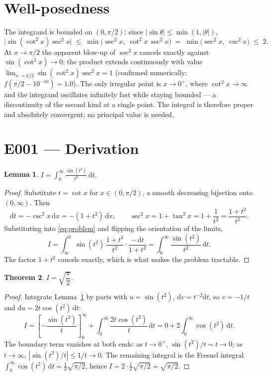 \documentclass[11pt]{article}
\newtheorem{theorem}{Theorem}
\newtheorem{lemma}[theorem]{Lemma}
\begin{document}
\section{Well-posedness}

The integrand is bounded on $(0,\pi/2)$: since $|\sin\theta|\le\min(1,|\theta|)$,
\[
  \big|\sin(\cot^{2}x)\sec^{2}x\big|
  \;\le\; \min\!\big(\sec^{2}x,\;\cot^{2}x\,\sec^{2}x\big)
  \;=\; \min\!\big(\sec^{2}x,\;\csc^{2}x\big) \;\le\; 2 .
\]
At $x\to\pi/2$ the apparent blow-up of $\sec^{2}x$ cancels exactly against
$\sin(\cot^{2}x)\to0$: the product extends continuously with value
$\lim_{x\to\pi/2}\sin(\cot^{2}x)\sec^{2}x = 1$ (confirmed numerically:
$f(\pi/2-10^{-10})=1.0$). The only irregular point is $x\to0^{+}$, where
$\cot^{2}x\to\infty$ and the integrand oscillates infinitely fast while staying
bounded --- a discontinuity of the second kind at a single point. The integral is
therefore proper and absolutely convergent; no principal value is needed.

\section{E001 --- Derivation}

\begin{lemma}\label{lem:sub}
  $I = \displaystyle\int_{0}^{\infty} \frac{\sin(t^{2})}{t^{2}}\,\mathrm{d}t$.
\end{lemma}

\begin{proof}
  Substitute $t=\cot x$ for $x\in(0,\pi/2)$, a smooth decreasing bijection onto
  $(0,\infty)$. Then
  \[
    \mathrm{d}t = -\csc^{2}x\,\mathrm{d}x = -(1+t^{2})\,\mathrm{d}x,
    \qquad
    \sec^{2}x = 1+\tan^{2}x = 1+\frac{1}{t^{2}} = \frac{1+t^{2}}{t^{2}} .
  \]
  Substituting into \eqref{eq:problem} and flipping the orientation of the
  limits,
  \[
    I=\int_{\infty}^{0}\sin(t^{2})\,\frac{1+t^{2}}{t^{2}}
        \cdot\frac{-\,\mathrm{d}t}{1+t^{2}}
     =\int_{0}^{\infty}\frac{\sin(t^{2})}{t^{2}}\,\mathrm{d}t .
  \]
  The factor $1+t^{2}$ cancels exactly, which is what makes the problem tractable.
\end{proof}

\begin{theorem}\label{thm:main}
  $I=\sqrt{\dfrac{\pi}{2}}$.
\end{theorem}

\begin{proof}
  Integrate Lemma~\ref{lem:sub} by parts with $u=\sin(t^{2})$, $\mathrm{d}v=t^{-2}\mathrm{d}t$,
  so $v=-1/t$ and $\mathrm{d}u = 2t\cos(t^{2})\,\mathrm{d}t$:
  \[
    I = \left[-\frac{\sin(t^{2})}{t}\right]_{0}^{\infty}
        + \int_{0}^{\infty}\frac{2t\cos(t^{2})}{t}\,\mathrm{d}t
      = 0 + 2\int_{0}^{\infty}\cos(t^{2})\,\mathrm{d}t .
  \]
  The boundary term vanishes at both ends: as $t\to0^{+}$,
  $\sin(t^{2})/t \sim t \to 0$; as $t\to\infty$, $|\sin(t^{2})/t|\le 1/t \to 0$.
  The remaining integral is the Fresnel integral
  $\int_{0}^{\infty}\cos(t^{2})\,\mathrm{d}t=\tfrac12\sqrt{\pi/2}$, hence
  $I = 2\cdot\tfrac12\sqrt{\pi/2}=\sqrt{\pi/2}$.
\end{proof}
\end{document}
